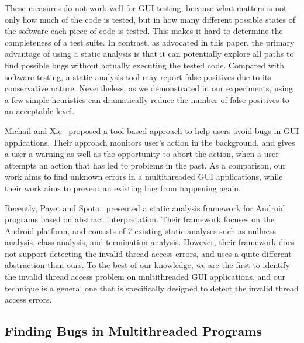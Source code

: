 These measures do not work well for GUI testing, because
what matters is not only how much of the code is tested,
but in how many different possible states of the software
each piece of code is tested. This makes it hard to determine
the completeness of a test suite. %
In contrast, as advocated in this paper, the primary advantage of
using a static analysis is that it can potentially explore
all paths to find possible bugs without actually executing the tested code. %
Compared with software testing, a static analysis tool may
report false positives due to its conservative nature.
Nevertheless, as we demonstrated in our experiments, using a few simple heuristics
can dramatically reduce the number of false positives  to
an acceptable level.


Michail and Xie~\cite{michail05:helping} proposed a tool-based approach to help users avoid bugs
in GUI applications. Their approach monitors user's action in the background,
and gives a user a warning as well as the opportunity to abort the action, when
a user attempts an action that has led to problems in the past. 
As a comparison, our work aims to find unknown errors in a multithreaded
GUI applications, while their work aims to prevent an existing bug
from happening again.


Recently, Payet and Spoto~\cite{Payet:2011:SAA:2032266.2032299} presented a static
analysis framework for Android programs based on  abstract
interpretation. Their framework focuses on the Android platform, and
 consists of 7 existing static analyses such as
nullness analysis, class analysis, and termination analysis.  However,
their framework does not support detecting the invalid thread access
errors, and uses a quite different abstraction than ours.
To the best of our knowledge, we are the first to identify the invalid
thread access problem on multithreaded GUI applications, and
our technique is a general one that is specifically designed to detect
the invalid thread access errors.


\subsection{Finding Bugs in Multithreaded Programs}



